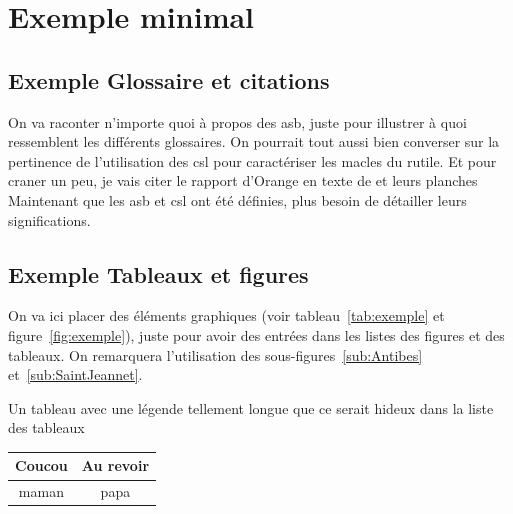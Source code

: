 		\section{Exemple minimal}
			\subsection{Exemple Glossaire et citations}
			On va raconter n'importe quoi à propos des \gls{asb}, juste pour illustrer à quoi ressemblent les différents glossaires. On pourrait tout aussi bien converser sur la pertinence de l'utilisation des \gls{csl} pour caractériser les \glspl{macle} du \gls{rutile}. Et pour craner un peu, je vais citer le rapport d'Orange en texte \cite{orangeTxt} de \citet{orangeTxt} et leurs planches \cite{orangePl}
			Maintenant que les \gls{asb} et \gls{csl} ont été définies, plus besoin de détailler leurs significations.
		
			\subsection{Exemple Tableaux et figures}
			On va ici placer des éléments graphiques (voir tableau~\ref{tab:exemple} et figure~\ref{fig:exemple}), juste pour avoir des entrées dans les listes des figures et des 	tableaux. On remarquera l'utilisation des sous-figures~\ref{sub:Antibes} et~\ref{sub:SaintJeannet}.
	
			\begin{tableth}
				\caption[Légende courte pour l'exemple de tableau]{Un tableau avec une légende tellement longue que ce serait hideux dans la liste des tableaux}
					\label{tab:exemple}
				\begin{tabular}{c|c}
					Coucou	& Au revoir\\
					\hline
					maman	& papa
				\end{tabular}
			\end{tableth}

